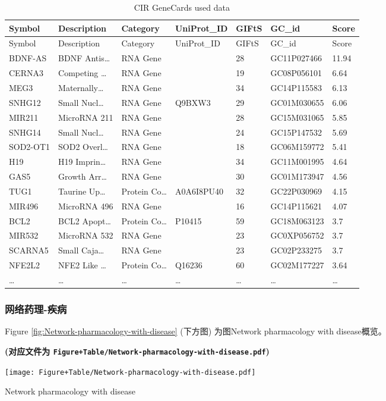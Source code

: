 \documentclass[
]{article}
\begin{document}
\begin{longtable}[]{@{}lllllll@{}}
\caption{\label{tab:CIR-GeneCards-used-data}CIR GeneCards used data}\tabularnewline
\toprule
Symbol & Description & Category & UniProt\_ID & GIFtS & GC\_id & Score\tabularnewline
\midrule
\endfirsthead
\toprule
Symbol & Description & Category & UniProt\_ID & GIFtS & GC\_id & Score\tabularnewline
\midrule
\endhead
BDNF-AS & BDNF Antis\ldots{} & RNA Gene & & 28 & GC11P027466 & 11.94\tabularnewline
CERNA3 & Competing \ldots{} & RNA Gene & & 19 & GC08P056101 & 6.64\tabularnewline
MEG3 & Maternally\ldots{} & RNA Gene & & 34 & GC14P115583 & 6.13\tabularnewline
SNHG12 & Small Nucl\ldots{} & RNA Gene & Q9BXW3 & 29 & GC01M030655 & 6.06\tabularnewline
MIR211 & MicroRNA 211 & RNA Gene & & 28 & GC15M031065 & 5.85\tabularnewline
SNHG14 & Small Nucl\ldots{} & RNA Gene & & 24 & GC15P147532 & 5.69\tabularnewline
SOD2-OT1 & SOD2 Overl\ldots{} & RNA Gene & & 18 & GC06M159772 & 5.41\tabularnewline
H19 & H19 Imprin\ldots{} & RNA Gene & & 34 & GC11M001995 & 4.64\tabularnewline
GAS5 & Growth Arr\ldots{} & RNA Gene & & 30 & GC01M173947 & 4.56\tabularnewline
TUG1 & Taurine Up\ldots{} & Protein Co\ldots{} & A0A6I8PU40 & 32 & GC22P030969 & 4.15\tabularnewline
MIR496 & MicroRNA 496 & RNA Gene & & 16 & GC14P115621 & 4.07\tabularnewline
BCL2 & BCL2 Apopt\ldots{} & Protein Co\ldots{} & P10415 & 59 & GC18M063123 & 3.7\tabularnewline
MIR532 & MicroRNA 532 & RNA Gene & & 23 & GC0XP056752 & 3.7\tabularnewline
SCARNA5 & Small Caja\ldots{} & RNA Gene & & 23 & GC02P233275 & 3.7\tabularnewline
NFE2L2 & NFE2 Like \ldots{} & Protein Co\ldots{} & Q16236 & 60 & GC02M177227 & 3.64\tabularnewline
\ldots{} & \ldots{} & \ldots{} & \ldots{} & \ldots{} & \ldots{} & \ldots{}\tabularnewline
\bottomrule
\end{longtable}

\hypertarget{ux7f51ux7edcux836fux7406-ux75beux75c5}{%
\subsubsection{网络药理-疾病}\label{ux7f51ux7edcux836fux7406-ux75beux75c5}}

Figure \ref{fig:Network-pharmacology-with-disease} (下方图) 为图Network pharmacology with disease概览。

\textbf{(对应文件为 \texttt{Figure+Table/Network-pharmacology-with-disease.pdf})}

\def\@captype{figure}
\begin{center}
\texttt{[image: Figure+Table/Network-pharmacology-with-disease.pdf]}
\caption{Network pharmacology with disease}\label{fig:Network-pharmacology-with-disease}
\end{center}
\end{document}
